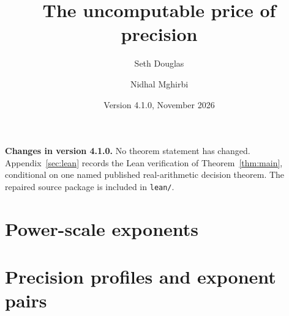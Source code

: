 \documentclass[11pt,a4paper]{article}
\title{The uncomputable price of precision}
\author{Seth Douglas \and Nidhal Mghirbi}
\date{Version 4.1.0, November 2026}
\theoremstyle{plain}
\theoremstyle{definition}
\theoremstyle{remark}
\numberwithin{equation}{section}
\begin{document}
\maketitle

\begin{center}\small
\begin{minipage}{0.92\linewidth}
\textbf{Changes in version 4.1.0.} No theorem statement has changed. Appendix~\ref{sec:lean} records the Lean verification of Theorem~\ref{thm:main}, conditional on one named published real-arithmetic decision theorem. The repaired source package is included in \texttt{lean/}.
\end{minipage}
\end{center}
\clearpage
{\small\setcounter{tocdepth}{1}\tableofcontents}
\clearpage















\clearpage

\clearpage
\part*{Power-scale exponents}
\setcounter{section}{0}
\renewcommand{\thesection}{P\arabic{section}}
\renewcommand{\theHsection}{power.\arabic{section}}









\clearpage
\part*{Precision profiles and exponent pairs}
\setcounter{section}{0}
\renewcommand{\thesection}{Q\arabic{section}}
\renewcommand{\theHsection}{profiles.\arabic{section}}







\clearpage
\setcounter{section}{16}
\renewcommand{\thesection}{\arabic{section}}
\renewcommand{\theHsection}{\arabic{section}}


\appendix


\begingroup

\endgroup
\begingroup

\endgroup

\end{document}
